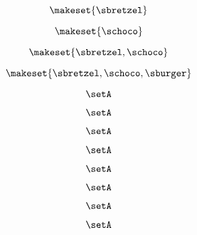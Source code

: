\begin{forslides}
    \begin{equation}
        \label{eq:combination-156}
        \makeset{ \sbretzel }
    \end{equation}

    \begin{equation}
        \label{eq:combination-157}
        \makeset{ \schoco }
    \end{equation}

    \begin{equation}
        \label{eq:combination-158}
        \makeset{ \sbretzel, \schoco }
    \end{equation}

    \begin{equation}
        \label{eq:combination-159}
        \makeset{ \sbretzel, \schoco, \sburger }
    \end{equation}

    \begin{equation}
        \label{eq:combination-160}
        \setA
    \end{equation}

    \begin{equation}
        \label{eq:combination-161}
        \setA
    \end{equation}

    \begin{equation}
        \label{eq:combination-162}
        \setA
    \end{equation}

    \begin{equation}
        \label{eq:combination-163}
        \setA
    \end{equation}

    \begin{equation}
        \label{eq:combination-164}
        \setA
    \end{equation}

    \begin{equation}
        \label{eq:combination-165}
        \setA
    \end{equation}

    \begin{equation}
        \label{eq:combination-166}
        \setA
    \end{equation}

    \begin{equation}
        \label{eq:combination-167}
        \setA
    \end{equation}


\end{forslides}
